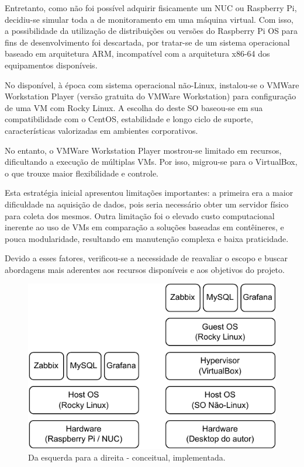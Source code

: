 Entretanto, como não foi possível adquirir fisicamente um NUC ou Raspberry Pi, decidiu-se simular toda a  de monitoramento em uma máquina virtual. Com isso, a possibilidade da utilização de distribuições ou versões do Raspberry Pi OS para fins de desenvolvimento foi descartada, por tratar-se de um sistema operacional baseado em arquitetura ARM, incompatível com a arquitetura x86-64 dos equipamentos disponíveis.

No  disponível, à época com sistema operacional não-Linux, instalou-se o VMWare Workstation Player (versão gratuita do VMWare Workstation) para configuração de uma VM com Rocky Linux. A escolha do deste SO baseou-se em sua compatibilidade com o CentOS, estabilidade e longo ciclo de suporte, características valorizadas em ambientes corporativos.

No entanto, o VMWare Workstation Player mostrou-se limitado em recursos, dificultando a execução de múltiplas VMs. Por isso, migrou-se para o VirtualBox, o que trouxe maior flexibilidade e controle.

Esta estratégia inicial apresentou limitações importantes: a primeira era a maior dificuldade na aquisição de dados, pois seria necessário obter um servidor físico para coleta dos mesmos. Outra limitação foi o elevado custo computacional inerente ao uso de VMs em comparação a soluções baseadas em contêineres, e pouca modularidade, resultando em manutenção complexa e baixa praticidade.

Devido a esses fatores, verificou-se a necessidade de reavaliar o escopo e buscar abordagens mais aderentes aos recursos disponíveis e aos objetivos do projeto.

\begin{figure}[H]
\centering
\includegraphics[scale=1]{Imagens/chap03/v0xv1_stack.pdf}
\caption{Da esquerda para a direita -  conceitual,  implementada.}
\label{fig:StackImplementada}
\end{figure}

